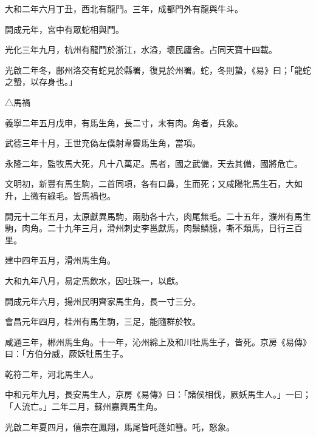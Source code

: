 \begin{pinyinscope}
 大和二年六月丁丑，西北有龍鬥。三年，成都門外有龍與牛斗。



 開成元年，宮中有眾蛇相與鬥。



 光化三年九月，杭州有龍鬥於浙江，水溢，壞民廬舍。占同天寶十四載。



 光啟二年冬，鄜州洛交有蛇見於縣署，復見於州署。蛇，冬則蟄，《易》曰；「龍蛇之蟄，以存身也。」



 △馬禍



 義寧二年五月戊申，有馬生角，長二寸，末有肉。角者，兵象。



 武德三年十月，王世充偽左僕射韋霽馬生角，當項。



 永隆二年，監牧馬大死，凡十八萬疋。馬者，國之武備，天去其備，國將危亡。



 文明初，新豐有馬生駒，二首同項，各有口鼻，生而死；又咸陽牝馬生石，大如升，上微有綠毛。皆馬禍也。



 開元十二年五月，太原獻異馬駒，兩肋各十六，肉尾無毛。二十五年，濮州有馬生駒，肉角。二十九年三月，滑州刺史李邕獻馬，肉鬃鱗臆，嘶不類馬，日行三百里。



 建中四年五月，滑州馬生角。



 大和九年八月，易定馬飲水，因吐珠一，以獻。



 開成元年六月，揚州民明齊家馬生角，長一寸三分。



 會昌元年四月，桂州有馬生駒，三足，能隨群於牧。



 咸通三年，郴州馬生角。十一年，沁州綿上及和川牡馬生子，皆死。京房《易傳》曰：「方伯分威，厥妖牡馬生子。



 乾符二年，河北馬生人。



 中和元年九月，長安馬生人，京房《易傳》曰：「諸侯相伐，厥妖馬生人。」一曰；「人流亡。」二年二月，蘇州嘉興馬生角。



 光啟二年夏四月，僖宗在鳳翔，馬尾皆吒蓬如篲。吒，怒象。




\end{pinyinscope}
